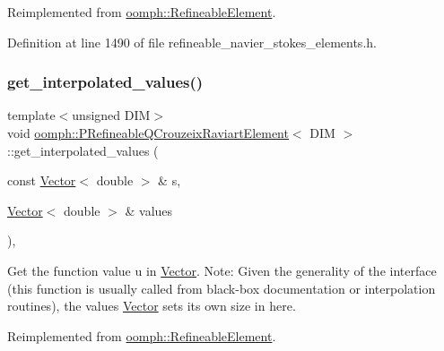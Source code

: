 Reimplemented from \hyperlink{classoomph_1_1RefineableElement_a86ea01c485f7ff822dce74b884312ccb}{oomph\+::\+Refineable\+Element}.



Definition at line 1490 of file refineable\+\_\+navier\+\_\+stokes\+\_\+elements.\+h.

\mbox{\label{classoomph_1_1PRefineableQCrouzeixRaviartElement_ac9cfbe5c8df894511fd03d49b4015d19}} 
\subsubsection{\texorpdfstring{get\+\_\+interpolated\+\_\+values()}{get\_interpolated\_values()}\hspace{0.1cm}{\footnotesize\ttfamily [1/2]}}
{\footnotesize\ttfamily template$<$unsigned D\+IM$>$ \\
void \hyperlink{classoomph_1_1PRefineableQCrouzeixRaviartElement}{oomph\+::\+P\+Refineable\+Q\+Crouzeix\+Raviart\+Element}$<$ D\+IM $>$\+::get\+\_\+interpolated\+\_\+values (\begin{DoxyParamCaption}\item[{const \hyperlink{classoomph_1_1Vector}{Vector}$<$ double $>$ \&}]{s,  }\item[{\hyperlink{classoomph_1_1Vector}{Vector}$<$ double $>$ \&}]{values }\end{DoxyParamCaption})\hspace{0.3cm}{\ttfamily [inline]}, {\ttfamily [virtual]}}



Get the function value u in \hyperlink{classoomph_1_1Vector}{Vector}. Note\+: Given the generality of the interface (this function is usually called from black-\/box documentation or interpolation routines), the values \hyperlink{classoomph_1_1Vector}{Vector} sets its own size in here. 



Reimplemented from \hyperlink{classoomph_1_1RefineableElement_ad9a4f92880668a2373326d8306365c43}{oomph\+::\+Refineable\+Element}.



